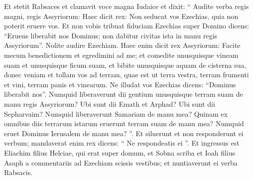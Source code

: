\begin{biblechapter}
\begin{biblechapter}
\begin{biblechapter}
\begin{biblechapter}
\begin{biblechapter}
\begin{biblechapter}
\begin{biblechapter}
\begin{biblechapter}
\begin{biblechapter}
\begin{biblechapter}
\begin{biblechapter}
\begin{biblechapter}
\begin{biblechapter}
\begin{biblechapter}
\begin{biblechapter}
\begin{biblechapter}
\begin{biblechapter}
\begin{biblechapter}
\begin{biblechapter}
\begin{biblechapter}
\begin{biblechapter}
\begin{biblechapter}
\begin{biblechapter}
\begin{biblechapter}
\begin{biblechapter}
\begin{biblechapter}
\begin{biblechapter}
\begin{biblechapter}
\begin{biblechapter}
\begin{biblechapter}
\begin{biblechapter}
\begin{biblechapter}
\begin{biblechapter}
\begin{biblechapter}
\begin{biblechapter}
\begin{biblechapter}
 \verse Et stetit Rabsaces et clamavit voce magna Iudaice et dixit: “ Audite verba regis magni, regis Assyriorum: 
\verse Haec dicit rex: Non seducat vos Ezechias, quia non poterit eruere vos. 
\verse Et non vobis tribuat fiduciam Ezechias super Domino dicens: “Eruens liberabit nos Dominus; non dabitur civitas ista in manu regis Assyriorum”. 
\verse Nolite audire Ezechiam. Haec enim dicit rex Assyriorum: Facite mecum benedictionem et egredimini ad me; et comedite unusquisque vineam suam et unusquisque ficum suam, et bibite unusquisque aquam de cisterna sua, 
\verse donec veniam et tollam vos ad terram, quae est ut terra vestra, terram frumenti et vini, terram panis et vinearum. 
\verse Ne illudat vos Ezechias dicens: “Dominus liberabit nos”. Numquid liberaverunt dii gentium unusquisque terram suam de manu regis Assyriorum? 
\verse Ubi sunt dii Emath et Arphad? Ubi sunt dii Sepharvaim? Numquid liberaverunt Samariam de manu mea? 
 \verse Quinam ex omnibus diis terrarum istarum eruerunt terram suam de manu mea? Numquid eruet Dominus Ierusalem de manu mea? ”.
 \verse Et siluerunt et non responderunt ei verbum; mandaverat enim rex dicens: “ Ne respondeatis ei ”. 
\verse Et ingressus est Eliachim filius Helciae, qui erat super domum, et Sobna scriba et Ioah filius Asaph a commentariis ad Ezechiam scissis vestibus; et nuntiaverunt ei verba Rabsacis.
 

\end{biblechapter}
\end{biblechapter}
\end{biblechapter}
\end{biblechapter}
\end{biblechapter}
\end{biblechapter}
\end{biblechapter}
\end{biblechapter}
\end{biblechapter}
\end{biblechapter}
\end{biblechapter}
\end{biblechapter}
\end{biblechapter}
\end{biblechapter}
\end{biblechapter}
\end{biblechapter}
\end{biblechapter}
\end{biblechapter}
\end{biblechapter}
\end{biblechapter}
\end{biblechapter}
\end{biblechapter}
\end{biblechapter}
\end{biblechapter}
\end{biblechapter}
\end{biblechapter}
\end{biblechapter}
\end{biblechapter}
\end{biblechapter}
\end{biblechapter}
\end{biblechapter}
\end{biblechapter}
\end{biblechapter}
\end{biblechapter}
\end{biblechapter}
\end{biblechapter}
